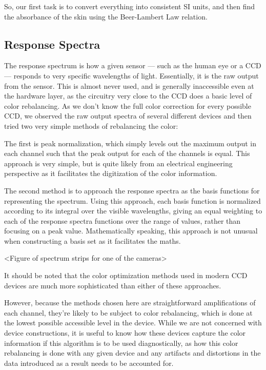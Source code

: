 So, our first task is to convert everything into consistent SI units, and then find the absorbance of the skin using the Beer-Lambert Law relation.

\subsection{Response Spectra}

The response spectrum is how a given sensor --- such as the human eye or a CCD --- responds to very specific wavelengths of light. Essentially, it is the raw output from the sensor. This is almost never used, and is generally inaccessible even at the hardware layer, as the circuitry very close to the CCD does a basic level of color rebalancing. As we don't know the full color correction for every possible CCD, we observed the raw output spectra of several different devices and then tried two very simple methods of rebalancing the color:

The first is peak normalization, which simply levels out the maximum output in each channel such that the peak output for each of the channels is equal. This approach is very simple, but is quite likely from an electrical engineering perspective as it facilitates the digitization of the color information.

The second method is to approach the response spectra as the basis functions for representing the spectrum. Using this approach, each basis function is normalized according to its integral over the visible wavelengths, giving an equal weighting to each of the response spectra functions over the range of values, rather than focusing on a peak value. Mathematically speaking, this approach is not unusual when constructing a basis set as it facilitates the maths.

<Figure of spectrum strips for one of the cameras>

It should be noted that the color optimization methods used in modern CCD devices are much more sophisticated than either of these approaches.

However, because the methods chosen here are straightforward amplifications of each channel, they're likely to be subject to color rebalancing, which is done at the lowest possible accessible level in the device. While we are not concerned with device constructions, it is useful to know how these devices capture the color information if this algorithm is to be used diagnostically, as how this color rebalancing is done with any given device and any artifacts and distortions in the data introduced as a result needs to be accounted for.

